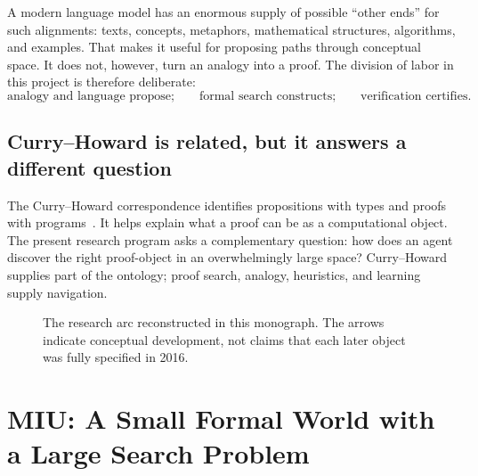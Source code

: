 \documentclass[11pt,oneside]{book}
\theoremstyle{definition}
\theoremstyle{remark}
\begin{document}
A modern language model has an enormous supply of possible ``other ends'' for such alignments: texts, concepts, metaphors, mathematical structures, algorithms, and examples. That makes it useful for proposing paths through conceptual space. It does not, however, turn an analogy into a proof. The division of labor in this project is therefore deliberate:
\[
\text{analogy and language propose;}\qquad
\text{formal search constructs;}\qquad
\text{verification certifies.}
\]

\section{Curry--Howard is related, but it answers a different question}
The Curry--Howard correspondence identifies propositions with types and proofs with programs~\cite{howard1980}. It helps explain what a proof can be as a computational object. The present research program asks a complementary question: how does an agent discover the right proof-object in an overwhelmingly large space? Curry--Howard supplies part of the ontology; proof search, analogy, heuristics, and learning supply navigation.

\begin{figure}[ht]
\centering
{}
\caption{The research arc reconstructed in this monograph. The arrows indicate conceptual development, not claims that each later object was fully specified in 2016.}
\label{fig:arc}
\end{figure}

\chapter{MIU: A Small Formal World with a Large Search Problem}
\end{document}
